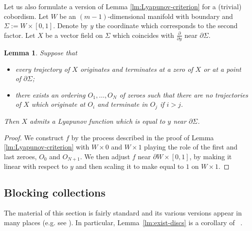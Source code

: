 \documentclass[12pt]{amsart}
\theoremstyle{plain}
\newtheorem{lemma}[theorem]{Lemma}
\theoremstyle{definition}
\theoremstyle{remark}
\newcommand{\p}{\partial}
\begin{document}
Let us also formulate a version of Lemma \ref{lm:Lyapunov-criterion} for a (trivial) cobordism. Let $W$ be an $(m-1)$-dimensional manifold with boundary and $\Sigma:=W\times [0,1]$. Denote by $y$ the coordinate  which corresponds to the second factor. Let $X$ be  a vector field on $\Sigma$ which coincides with $\frac{\p}{\p y}$ near $\p \Sigma$.
\begin{lemma}\label{lm:Lyapunov-criterion-rel}
Suppose that
\begin{itemize}
\item[(L$1'$)]   every trajectory of $X$ originates and terminates at a  zero of $X$ or at a point of $\p\Sigma$;
\item[(L2)]  there exists an  ordering  $O_1,\dots, O_N$ of zeroes such that there are no trajectories of $X$ which originate at $O_i$ and terminate in $O_j$ if $i>j$.
\end{itemize}
Then $X$ admits a Lyapunov function which is equal  to $y$ near $\p \Sigma$.
\end{lemma}
\begin{proof}
We construct $f$ by the  process described in the proof of Lemma
  \ref{lm:Lyapunov-criterion} with $W\times 0$ and $W\times 1$ playing the role of the first and last zeroes, $O_0$ and $O_{N+1}$. We then   adjust $f$ near $\p W\times[0,1]$,  by making it linear with respect to $y$ and  then scaling it to make equal to $1$ on $W\times 1$.
  \end{proof} 



\subsection{Blocking collections}\label{sec:blocking} The material of this section is fairly standard and its various versions appear in many places (e.g. see \cite{GE71,Wi}). In particular, Lemma~\ref{lm:exist-discs} is a corollary of ~\cite[Lemma 2]{Wi}.
\end{document}
